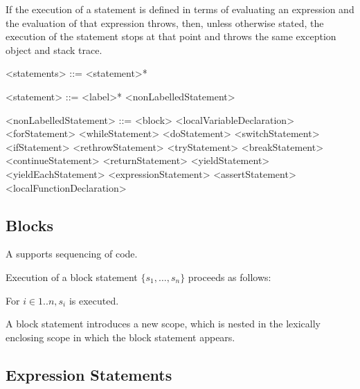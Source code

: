 \documentclass[makeidx]{article}
\begin{document}
If the execution of a statement is defined in terms of evaluating an expression
and the evaluation of that expression throws,
then, unless otherwise stated, the execution of the statement stops
at that point and throws the same exception object and stack trace.

\LMHash{}%

\begin{grammar}
<statements> ::= <statement>*

<statement> ::= <label>* <nonLabelledStatement>

<nonLabelledStatement> ::= <block>
  \alt <localVariableDeclaration>
  \alt <forStatement>
  \alt <whileStatement>
  \alt <doStatement>
  \alt <switchStatement>
  \alt <ifStatement>
  \alt <rethrowStatement>
  \alt <tryStatement>
  \alt <breakStatement>
  \alt <continueStatement>
  \alt <returnStatement>
  \alt <yieldStatement>
  \alt <yieldEachStatement>
  \alt <expressionStatement>
  \alt <assertStatement>
  \alt <localFunctionDeclaration>
\end{grammar}


\subsection{Blocks}

\LMHash{}%
A  supports sequencing of code.

\LMHash{}%
Execution of a block statement $\{s_1, \ldots, s_n\}$ proceeds as follows:

\LMHash{}%
For $i \in 1 .. n, s_i$ is executed.

\LMHash{}%
A block statement introduces a new scope, which is nested in the lexically enclosing scope in which the block statement appears.


\subsection{Expression Statements}
\end{document}
